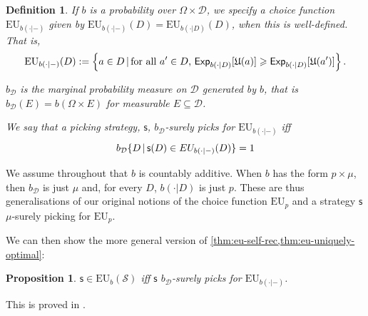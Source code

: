 \documentclass[a4paper,final]{article}
\newtheorem{definition}[theorem]{Definition}
\newtheorem{proposition}[theorem]{Proposition}
\newcommand\Exp{\mathsf{Exp}}
\newcommand\EU{\mathrm{EU}}
\newcommand\U{\mathfrak{U}} %
\newcommand{\D}{\mathcal{D}}
\newcommand{\Decs}{\mathcal{D}}
\renewcommand\S{\mathcal{S}}
\newcommand\s{\mathsf{s}}
\newcommand{\todoold}[2][]{\todo[backgroundcolor=white,bordercolor=orange!10,linecolor=gray!10, #1,caption={},textcolor=gray]{Pre-rev: #2}}
\newcommand{\todooldinfo}[2][]{\todoold[#1]{#2}}
\newcommand{\Strategies}{\S}
\newcommand\SetDelimiter[1][]{
	\nonscript\,#1\vert \allowbreak \nonscript\,\mathopen{}}
\providecommand\given{\SetDelimiter}
\renewcommand{\geq}{\geqslant}
\newenvironment{CCM rewritten}
{\begingroup\color{blue}} %
{\endgroup}              %
\begin{document}
\begin{definition}\label{def:cond}
	If $b$ is a probability over $\Omega\times \D$, we specify a choice function 
	$\EU_{b(\cdot|-)}$ given by $\EU_{b(\cdot|-)}(D)=\EU_{b(\cdot|D)}(D)$, when this is well-defined. That is, $$\EU_{b(\cdot|-)}(D):=\left \{a\in D\given \text{for all $a'\in D$, }\Exp_{b(\cdot|D)}[\U(a)]\geq \Exp_{b(\cdot|D)}[\U(a')]\right \}.$$%

$b_\Decs$ is the marginal probability measure on $\Decs$ generated by $b$, that is $b_\D(E)=b(\Omega\times E)$ for measurable $E\subseteq\Decs$.%

We say that %
a picking strategy, $\s$, \emph{$b_\Decs$-surely picks for $\EU_{b(\cdot|-)}$} iff \[b_\Decs\{D\given \s(D)\in EU_{b(\cdot|-)}(D)\}=1\]
\end{definition}
We assume throughout that $b$ is countably additive. When $b$ has the form $p\times\mu$, then $b_\Decs$ is just $\mu$ and, for every $D$, $b(\cdot|D)$ is just $p$. These are thus generalisations of our original notions of the choice function $\EU_p$ and a strategy $\s$ $\mu$-surely picking for $\EU_p$. 

We can then show the more general version of \cref{thm:eu-self-rec,thm:eu-uniquely-optimal}:
\begin{proposition}\label{thm:eu-dep}
	$\s\in\EU_b(\Strategies)$ iff $\s$ $b_\Decs$-surely picks for $\EU_{b(\cdot|-)}$.
\end{proposition}
This is proved in .


\end{document}
